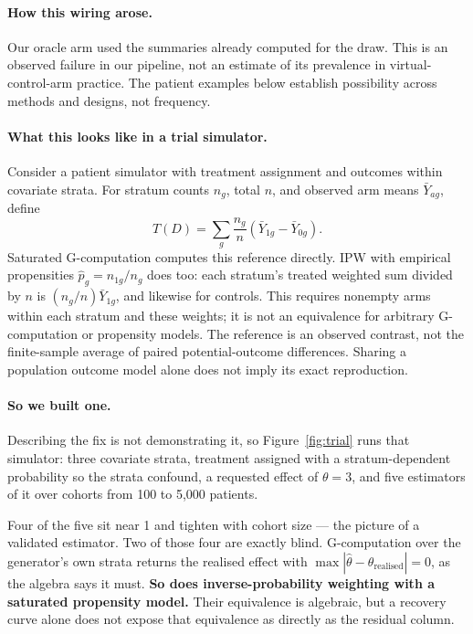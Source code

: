 \paragraph{How this wiring arose.} Our oracle arm used the summaries already
computed for the draw. This is an observed failure in our pipeline, not an
estimate of its prevalence in virtual-control-arm practice. The patient
examples below establish possibility across methods and designs, not frequency.

\paragraph{What this looks like in a trial simulator.} Consider a patient
simulator with treatment assignment and outcomes within covariate strata.
For stratum counts $n_g$, total $n$, and observed arm means $\bar Y_{ag}$, define
\[
T(D)=\sum_g\frac{n_g}{n}(\bar Y_{1g}-\bar Y_{0g}).
\]
Saturated G-computation \citep{robins1986} computes this reference directly.
IPW with empirical propensities $\hat p_g=n_{1g}/n_g$ does too: each stratum's
treated weighted sum divided by $n$ is $(n_g/n)\bar Y_{1g}$, and likewise for
controls. This requires nonempty arms within each stratum and these weights;
it is not an equivalence for arbitrary G-computation or propensity models.
The reference is an observed contrast, not the finite-sample average of paired
potential-outcome differences. Sharing a population outcome model alone does
not imply its exact reproduction.

\paragraph{So we built one.} Describing the fix is not demonstrating it, so
Figure~\ref{fig:trial} runs that simulator: three covariate strata, treatment
assigned with a stratum-dependent probability so the strata confound, a
requested effect of $\theta = 3$, and five estimators of it over cohorts from
100 to 5{,}000 patients.

Four of the five sit near 1 and tighten with cohort size --- the picture of a
validated estimator. Two of those four are exactly blind. G-computation over
the generator's own strata returns the realised effect with
$\max|\hat\theta - \theta_{\text{realised}}| = 0$, as the algebra says it must.
\textbf{So does inverse-probability weighting with a saturated propensity
model.} Their equivalence is algebraic, but a recovery curve alone does not expose
that equivalence as directly as the residual column.

